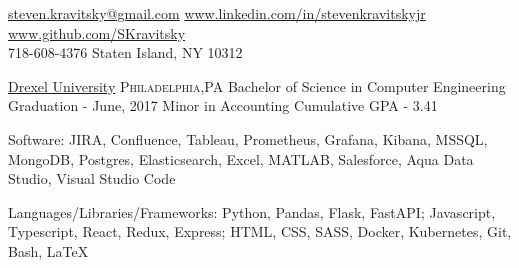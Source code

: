 \documentclass[10pt,letterpaper]{article}
\begin{document}
\sloppy  %

\nobreakvspace{0.3em}  %

\noindent\href{mailto:steven.kravitsky@gmail.com}{steven.kravitsky\mbox{}@\mbox{}gmail.com}\sbull
\href{https://www.linkedin.com/in/stevenkravitskyjr}{www.linkedin.com/in/stevenkravitskyjr}\sbull
\href{https://github.com/SKravitsky}{www.github.com/SKravitsky}
\\
718-608-4376\sbull
Staten Island, NY 10312

\spacedhrule{0.9em}{-0.4em}  %


\headedsection
  {\href{http://www.drexel.edu/}{Drexel University}}
  {\textsc{Philadelphia,PA}} {%
  \headedsubsectiontwo
    {Bachelor of Science in Computer Engineering}
    {Graduation - June, 2017}
    {Minor in Accounting}
    {Cumulative GPA - 3.41}
}

\spacedhrule{0.9em}{-0.4em}


\inlineheadsection  %
  {Software:}
  {JIRA, Confluence, Tableau, Prometheus, Grafana, Kibana, MSSQL, MongoDB, Postgres, Elasticsearch, Excel, MATLAB, Salesforce, Aqua Data Studio, Visual Studio Code}

\vspace{0.1em}
\inlineheadsection
  {Languages/Libraries/Frameworks:}
  {Python, Pandas, Flask, FastAPI; Javascript, Typescript, React, Redux, Express; HTML, CSS, SASS, Docker, Kubernetes, Git, Bash, LaTeX}

\spacedhrule{1.8em}{-0.4em}

\end{document}
